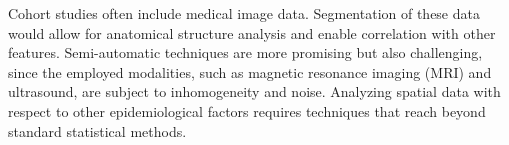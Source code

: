 \documentclass[journal]{style/vgtc} 			          %
\begin{document}
%
Cohort studies often include medical image data.
%
Segmentation of these data would allow for anatomical structure analysis and enable correlation with other features.
%
%
%
Semi-automatic techniques are more promising but also challenging, since the employed modalities, such as magnetic resonance imaging (MRI) and ultrasound, are subject to inhomogeneity and noise.
%
Analyzing spatial data with respect to other epidemiological factors requires techniques that reach beyond standard statistical methods.
\end{document}
